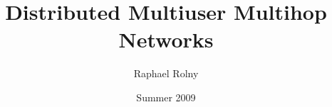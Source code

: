 \documentclass[a4paper,11pt]{book}
\begin{document}
\frontmatter
\title{Distributed Multiuser Multihop Networks}
\author{Raphael Rolny}
\date{Summer 2009}

\begin{titlepage}
  
\end{titlepage}


\tableofcontents
\listoffigures 
\listoftables
\listofalgorithms

\mainmatter
\renewcommand{\baselinestretch}{1}\normalsize %


\appendix
%

\cleardoublepage
{} 


\cleardoublepage

\end{document}
